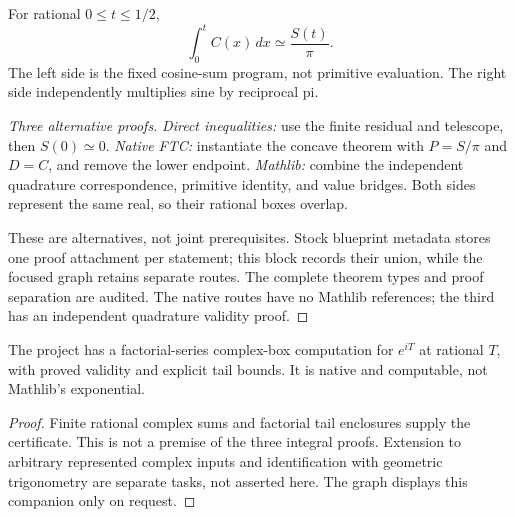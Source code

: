 \begin{theorem}\label{thm:c3-primitive}
\leanok
For rational $0\le t\le1/2$,
\[
 \boxed{\int_0^t C(x)\,dx\simeq\frac{S(t)}{\pi}.}
\]
The left side is the fixed cosine-sum program, not primitive evaluation.
The right side independently multiplies sine by reciprocal pi.
\end{theorem}
\begin{proof}[Three alternative proofs]
\leanok
{}
\emph{Direct inequalities:} use the finite residual and telescope, then
$S(0)\simeq0$. \emph{Native FTC:} instantiate the concave theorem with
$P=S/\pi$ and $D=C$, and remove the lower endpoint.
\emph{Mathlib:} combine the independent quadrature correspondence, primitive
identity, and value bridges. Both sides represent the same real, so their
rational boxes overlap.

These are alternatives, not joint prerequisites. Stock blueprint metadata
stores one proof attachment per statement; this block records their union,
while the focused graph retains separate routes. The complete theorem types
and proof separation are audited. The native routes have no Mathlib
references; the third has an independent quadrature validity proof.
\end{proof}

\begin{lemma}\label{lem:c3-native-exp}
\leanok
The project has a factorial-series complex-box computation for $e^{iT}$ at
rational $T$, with proved validity and explicit tail bounds. It is native
and computable, not Mathlib's exponential.
\end{lemma}
\begin{proof}\leanok
Finite rational complex sums and factorial tail enclosures supply the
certificate. This is not a premise of the three integral proofs. Extension
to arbitrary represented complex inputs and identification with geometric
trigonometry are separate tasks, not asserted here. The graph displays this
companion only on request.
\end{proof}

